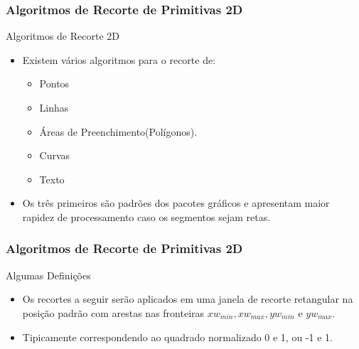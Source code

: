 \documentclass{beamer}
\begin{document}
\begin{frame}
\frametitle{Algoritmos de Recorte de Primitivas 2D}

	\begin{block}{Algoritmos de Recorte 2D}
		\begin{itemize}
			\item Existem vários algoritmos para o recorte de:
				\begin{itemize}
					\item Pontos
					\item Linhas
					\item Áreas de Preenchimento(Polígonos).
					\item Curvas
					\item Texto
				\end{itemize}
			\item Os três primeiros são padrões dos pacotes gráficos e apresentam maior rapidez de processamento caso os segmentos sejam retas.
		\end{itemize}
	\end{block}
	

\end{frame}

\begin{frame}
\frametitle{Algoritmos de Recorte de Primitivas 2D}

	\begin{block}{Algumas Definições}
		\begin{itemize}
			\item Os recortes a seguir serão aplicados em uma janela de recorte retangular na posição padrão com arestas nas fronteiras $xw_{min},xw_{max},yw_{min}$ e $yw_{max}$.
			\item Tipicamente correspondendo ao quadrado normalizado 0 e 1, ou -1 e 1.
		\end{itemize}
	\end{block}
\end{frame}


\end{document}
